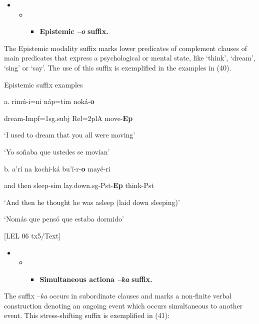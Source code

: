\begin{itemize}
\item \begin{itemize}
\item \begin{itemize}
\item \textbf{Epistemic \textit{–o} }\textbf{suffix.}
\end{itemize}
\end{itemize}
\end{itemize}

The Epistemic modality suffix marks lower predicates of complement clauses of main predicates that express a psychological or mental state, like ‘think’, ‘dream’, ‘sing’ or ‘say’. The use of this suffix is exemplified in the examples in (40).

   Epistemic suffix examples


a.    rimú-i=ni     náp=tim   noká-\textbf{o}



dream-Impf=1sg.subj   Rel=2plA   move-\textbf{Ep}



‘I used to dream that you all were moving’



‘Yo soñaba que ustedes se movían’      


  b.   a’rí   na      kochi-ká      bu’í-r-\textbf{o}       mayé-ri

and   then   sleep-sim   lay.down.sg-Pst-\textbf{Ep}   think-Pst

‘And then he thought he was asleep (laid down sleeping)’

‘Nomás que pensó que estaba dormido’    

[LEL 06 tx5/Text]

\begin{itemize}
\item \begin{itemize}
\item \begin{itemize}
\item \textbf{Simultaneous actiona \textit{–ka} }\textbf{suffix.} 
\end{itemize}
\end{itemize}
\end{itemize}

The suffix –\textit{ka} occurs in subordinate clauses and marks a non-finite verbal construction denoting an ongoing event which occurs simultaneous to another event. This stress-shifting suffix is exemplified in (41):


